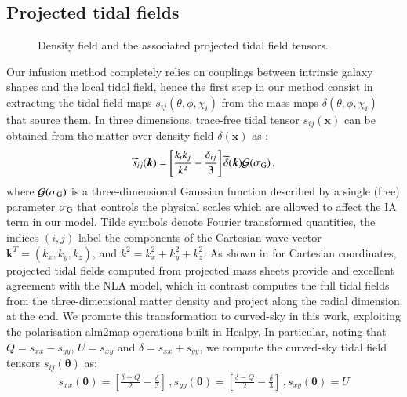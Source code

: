 \documentclass[useAMS,usenatbib]{mn2e}
\begin{document}
\subsection{Projected tidal fields}
\label{subsec:IA_sims}

\begin{figure}
\caption{Density field and the associated projected tidal field tensors.}
\label{fig:maps}
\end{figure}

Our infusion method completely relies on couplings between intrinsic galaxy shapes and the local tidal field, hence the first step in our method consist in extracting the tidal field maps $s_{ij}(\theta,\phi,\chi_i)$ from the mass maps $\delta(\theta,\phi,\chi_i)$ that source them. In three dimensions, trace-free tidal tensor $s_{ij}(\boldsymbol x)$ can be obtained from the matter over-density field $\delta(\boldsymbol x)$ as   \citep{Catelan_IA_Tidal}:
\begin{eqnarray}
 \widetilde{s}_{ij} (\boldsymbol k)  = \left[\frac{k_i k_j}{k^2} - \frac{\delta_{ij}}{3}\right]  \widetilde {\delta}(\boldsymbol k) \mathcal{G}(\sigma_{\rm G}) \, ,
 \label{eq:sij}
\end{eqnarray}
where $\mathcal{G}(\sigma_{\rm G})$ is a three-dimensional Gaussian function described by a single (free) parameter $\sigma_{\rm G}$ that  controls the physical scales which are allowed to affect the IA term in our model. 
Tilde symbols  denote Fourier transformed quantities,  the indices $(i,j)$ label the components of the Cartesian wave-vector $\boldsymbol{k}^T = (k_x,k_y,k_z)$, and $k^2 = k_x^2 + k_y^2 + k_z^2$. 
As shown in \citet{Tidalator} for Cartesian coordinates, projected tidal fields  computed from projected mass sheets provide and excellent agreement with the NLA model, which in contrast computes the full tidal fields from the three-dimensional matter density and project along the radial dimension at the end. We promote this transformation to curved-sky in this work, exploiting the  polarisation {\sc alm2map} operations built in {\sc Healpy}. In particular, noting that $Q=s_{xx}-s_{yy}$, $U=s_{xy}$ and $\delta=s_{xx}+s_{yy}$, we compute the curved-sky tidal field tensors ${s}_{ij}({\boldsymbol \theta})$ as:
 \begin{eqnarray}
s_{xx}({\boldsymbol \theta})  =  \left[\frac{ \delta + Q}{2}  - \frac{\delta}{3}\right] \, ,s_{yy}({\boldsymbol \theta})  =  \left[\frac{\delta - Q}{2}  - \frac{\delta}{3}\right] \, , s_{xy}({\boldsymbol \theta}) = U
 \label{eq:sij_2D_sph}
 \end{eqnarray}
\end{document}
